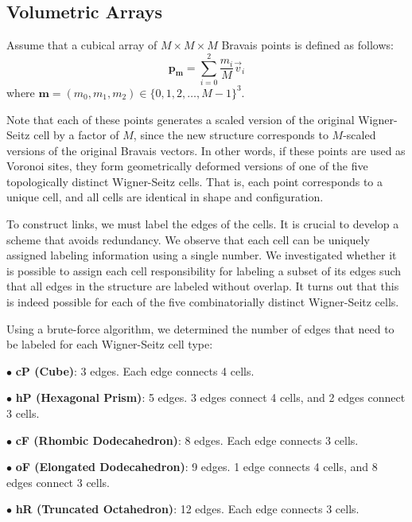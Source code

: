 \documentclass[times,twocolumn,final]{elsarticle}
\begin{document}
\subsection{Volumetric Arrays}

Assume that a cubical array of $M \times M \times M$ Bravais points is defined as follows:
\[
\mathbf{p}_\mathbf{m} = \sum_{i=0}^{2} \frac{m_i}{M} \vec{v}_i
\]
where $\mathbf{m} = (m_0,m_1,m_2) \in \{ 0,1,2,\ldots,M-1\}^3$.

Note that each of these points generates a scaled version of the original Wigner-Seitz cell by a factor of $M$, since the new structure corresponds to $M$-scaled versions of the original Bravais vectors. In other words, if these points are used as Voronoi sites, they form geometrically deformed versions of one of the five topologically distinct Wigner-Seitz cells. That is, each point corresponds to a unique cell, and all cells are identical in shape and configuration.

To construct links, we must label the edges of the cells. It is crucial to develop a scheme that avoids redundancy. We observe that each cell can be uniquely assigned labeling information using a single number. We investigated whether it is possible to assign each cell responsibility for labeling a subset of its edges such that all edges in the structure are labeled without overlap. It turns out that this is indeed possible for each of the five combinatorially distinct Wigner-Seitz cells.

Using a brute-force algorithm, we determined the number of edges that need to be labeled for each Wigner-Seitz cell type:

\noindent $\bullet$ \textbf{cP (Cube)}: 3 edges. Each edge connects 4 cells.

\noindent $\bullet$ \textbf{hP (Hexagonal Prism)}: 5 edges. 3 edges connect 4 cells, and 2 edges connect 3 cells.

\noindent $\bullet$ \textbf{cF (Rhombic Dodecahedron)}: 8 edges. Each edge connects 3 cells.

\noindent $\bullet$ \textbf{oF (Elongated Dodecahedron)}: 9 edges. 1 edge connects 4 cells, and 8 edges connect 3 cells.

\noindent $\bullet$ \textbf{hR (Truncated Octahedron)}: 12 edges. Each edge connects 3 cells.
\end{document}
